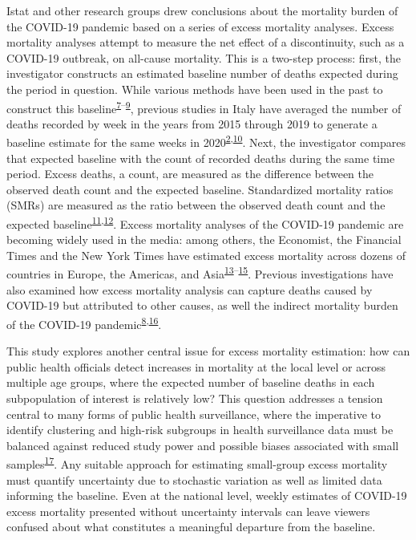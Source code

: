 \documentclass[
]{article}
\begin{document}
Istat and other research groups drew conclusions about the mortality burden of the COVID-19 pandemic based on a series of excess mortality analyses. Excess mortality analyses attempt to measure the net effect of a discontinuity, such as a COVID-19 outbreak, on all-cause mortality. This is a two-step process: first, the investigator constructs an estimated baseline number of deaths expected during the period in question. While various methods have been used in the past to construct this baseline\textsuperscript{\protect\hyperlink{ref-Serfling1963}{7}--\protect\hyperlink{ref-Noufaily2013}{9}}⁠, previous studies in Italy have averaged the number of deaths recorded by week in the years from 2015 through 2019 to generate a baseline estimate for the same weeks in 2020\textsuperscript{\protect\hyperlink{ref-Alicandro2020}{2},\protect\hyperlink{ref-Michelozzi2020}{10}}⁠. Next, the investigator compares that expected baseline with the count of recorded deaths during the same time period. Excess deaths, a count, are measured as the difference between the observed death count and the expected baseline. Standardized mortality ratios (SMRs) are measured as the ratio between the observed death count and the expected baseline\textsuperscript{\protect\hyperlink{ref-Dickman2004}{11},\protect\hyperlink{ref-Lambert2005}{12}}⁠. Excess mortality analyses of the COVID-19 pandemic are becoming widely used in the media: among others, the Economist, the Financial Times and the New York Times have estimated excess mortality across dozens of countries in Europe, the Americas, and Asia\textsuperscript{\protect\hyperlink{ref-Wu2020}{13}--\protect\hyperlink{ref-FTVisualux5cux26DataJournalismteam2020}{15}}⁠. Previous investigations have also examined how excess mortality analysis can capture deaths caused by COVID-19 but attributed to other causes, as well the indirect mortality burden of the COVID-19 pandemic\textsuperscript{\protect\hyperlink{ref-Weinberger2020a}{8},\protect\hyperlink{ref-U.S.NationalCenterforHealthStatistics2021}{16}}.

This study explores another central issue for excess mortality estimation: how can public health officials detect increases in mortality at the local level or across multiple age groups, where the expected number of baseline deaths in each subpopulation of interest is relatively low? This question addresses a tension central to many forms of public health surveillance, where the imperative to identify clustering and high-risk subgroups in health surveillance data must be balanced against reduced study power and possible biases associated with small samples\textsuperscript{\protect\hyperlink{ref-Thacker1988}{17}}⁠. Any suitable approach for estimating small-group excess mortality must quantify uncertainty due to stochastic variation as well as limited data informing the baseline. Even at the national level, weekly estimates of COVID-19 excess mortality presented without uncertainty intervals can leave viewers confused about what constitutes a meaningful departure from the baseline.
\end{document}
